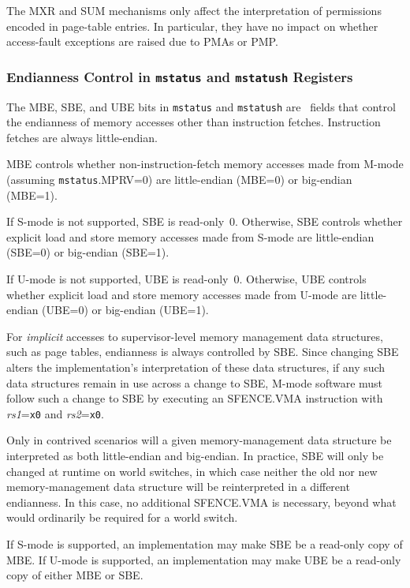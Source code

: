 The MXR and SUM mechanisms only affect the interpretation of permissions
encoded in page-table entries.  In particular, they have no impact on whether
access-fault exceptions are raised due to PMAs or PMP.

\subsubsection{Endianness Control in {\tt mstatus} and {\tt mstatush} Registers}

The MBE, SBE, and UBE bits in {\tt mstatus} and {\tt mstatush} are
\warl\ fields that control the endianness of memory accesses other than
instruction fetches.
Instruction fetches are always little-endian.

MBE controls whether non-instruction-fetch memory accesses made from
M-mode (assuming {\tt mstatus}.MPRV=0) are little-endian (MBE=0) or
big-endian (MBE=1).

If S-mode is not supported, SBE is read-only~0.
Otherwise, SBE controls whether explicit load and store memory accesses made
from S-mode are little-endian (SBE=0) or big-endian (SBE=1).

If U-mode is not supported, UBE is read-only~0.
Otherwise, UBE controls whether explicit load and store memory accesses made
from U-mode are little-endian (UBE=0) or big-endian (UBE=1).

For {\em implicit} accesses to supervisor-level memory management data
structures, such as page tables, endianness is always controlled by SBE.
Since changing SBE alters the implementation's interpretation of these data
structures, if any such data structures remain in use across a change to SBE,
M-mode software must follow such a change to SBE by executing an
SFENCE.VMA instruction with {\em rs1}={\tt x0} and {\em rs2}={\tt x0}.

\begin{commentary}
Only in contrived scenarios will a given memory-management data structure be
interpreted as both little-endian and big-endian.
In practice, SBE will only be changed at runtime on world switches, in which
case neither the old nor new memory-management data structure will be
reinterpreted in a different endianness.
In this case, no additional SFENCE.VMA is necessary, beyond what would
ordinarily be required for a world switch.
\end{commentary}

If S-mode is supported, an implementation may make SBE be a read-only
copy of MBE.
If U-mode is supported, an implementation may make UBE be a read-only
copy of either MBE or SBE.

